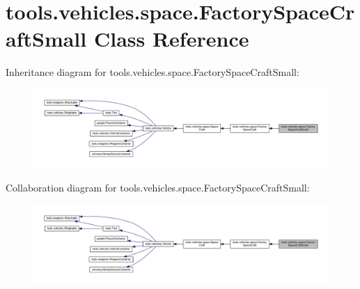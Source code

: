 \hypertarget{classtools_1_1vehicles_1_1space_1_1_factory_space_craft_small}{}\section{tools.\+vehicles.\+space.\+Factory\+Space\+Craft\+Small Class Reference}
\label{classtools_1_1vehicles_1_1space_1_1_factory_space_craft_small}


Inheritance diagram for tools.\+vehicles.\+space.\+Factory\+Space\+Craft\+Small\+:
\nopagebreak
\begin{figure}[H]
\begin{center}
\leavevmode
\includegraphics[width=350pt]{classtools_1_1vehicles_1_1space_1_1_factory_space_craft_small__inherit__graph}
\end{center}
\end{figure}


Collaboration diagram for tools.\+vehicles.\+space.\+Factory\+Space\+Craft\+Small\+:
\nopagebreak
\begin{figure}[H]
\begin{center}
\leavevmode
\includegraphics[width=350pt]{classtools_1_1vehicles_1_1space_1_1_factory_space_craft_small__coll__graph}
\end{center}
\end{figure}
